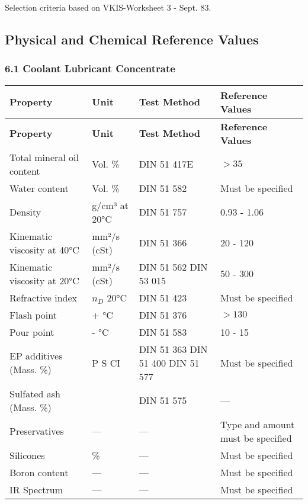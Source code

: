 
\setcounter{page}{2}

Selection criteria based on VKIS-Worksheet 3 - Sept. 83.

\subsection*{Physical and Chemical Reference Values}

\subsubsection*{6.1 Coolant Lubricant Concentrate}

\renewcommand{\arraystretch}{1.3}
\begin{longtable}{|p{6cm}|p{3cm}|p{3.5cm}|p{3.5cm}|}
    \hline
    \textbf{Property} & \textbf{Unit} & \textbf{Test Method} & \textbf{Reference Values} \\
    \hline
    \endfirsthead

    \hline
    \textbf{Property} & \textbf{Unit} & \textbf{Test Method} & \textbf{Reference Values} \\
    \hline
    \endhead

    \hline
    \endfoot

    \hline
    \endlastfoot

    Total mineral oil content & Vol. \% & DIN 51 417E & $> 35$ \\
    \hline
    Water content & Vol. \% & DIN 51 582 & Must be specified \\
    \hline
    Density & g/cm³ at 20°C & DIN 51 757 & 0.93 - 1.06 \\
    \hline
    Kinematic viscosity at 40°C & mm²/s (cSt) & DIN 51 366 & 20 - 120 \\
    \hline
    Kinematic viscosity at 20°C & mm²/s (cSt) & DIN 51 562 \newline DIN 53 015 & 50 - 300 \\
    \hline
    Refractive index & $n_D$ 20°C & DIN 51 423 & Must be specified \\
    \hline
    Flash point & + °C & DIN 51 376 & $> 130$ \\
    \hline
    Pour point & - °C & DIN 51 583 & 10 - 15 \\
    \hline
    EP additives (Mass. \%) & P \newline S \newline CI & DIN 51 363 \newline DIN 51 400 \newline DIN 51 577 & Must be specified \\
    \hline
    Sulfated ash (Mass. \%) &  & DIN 51 575 & --- \\
    \hline
    Preservatives & --- & --- & Type and amount must be specified \\
    \hline
    Silicones & \% & --- & Must be specified \\
    \hline
    Boron content & --- & --- & Must be specified \\
    \hline
    IR Spectrum & --- & --- & Must be specified \\
    \hline
\end{longtable}
\newpage

